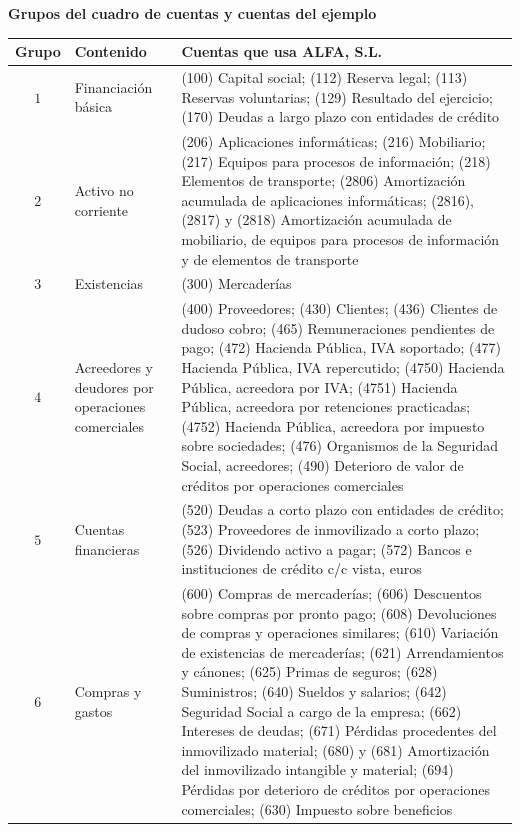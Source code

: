 \documentclass[10pt,a4paper]{article}
\begin{document}
\begin{center}\begin{minipage}{\linewidth}\centering
{\small\textbf{Grupos del cuadro de cuentas y cuentas del ejemplo}}\par\vspace{0.3em}
{\small
\begin{tabular}{c p{3.6cm} p{10.1cm}}
\hline
\textbf{Grupo} & \textbf{Contenido} & \textbf{Cuentas que usa ALFA, S.L.} \\
\hline
$1$ & \raggedright Financiación básica & (100) Capital social; (112) Reserva legal; (113) Reservas voluntarias; (129) Resultado del ejercicio; (170) Deudas a largo plazo con entidades de crédito \tabularnewline
$2$ & \raggedright Activo no corriente & (206) Aplicaciones informáticas; (216) Mobiliario; (217) Equipos para procesos de información; (218) Elementos de transporte; (2806) Amortización acumulada de aplicaciones informáticas; (2816), (2817) y (2818) Amortización acumulada de mobiliario, de equipos para procesos de información y de elementos de transporte \tabularnewline
$3$ & \raggedright Existencias & (300) Mercaderías \tabularnewline
$4$ & \raggedright Acreedores y deudores por operaciones comerciales & (400) Proveedores; (430) Clientes; (436) Clientes de dudoso cobro; (465) Remuneraciones pendientes de pago; (472) Hacienda Pública, IVA soportado; (477) Hacienda Pública, IVA repercutido; (4750) Hacienda Pública, acreedora por IVA; (4751) Hacienda Pública, acreedora por retenciones practicadas; (4752) Hacienda Pública, acreedora por impuesto sobre sociedades; (476) Organismos de la Seguridad Social, acreedores; (490) Deterioro de valor de créditos por operaciones comerciales \tabularnewline
$5$ & \raggedright Cuentas financieras & (520) Deudas a corto plazo con entidades de crédito; (523) Proveedores de inmovilizado a corto plazo; (526) Dividendo activo a pagar; (572) Bancos e instituciones de crédito c/c vista, euros \tabularnewline
$6$ & \raggedright Compras y gastos & (600) Compras de mercaderías; (606) Descuentos sobre compras por pronto pago; (608) Devoluciones de compras y operaciones similares; (610) Variación de existencias de mercaderías; (621) Arrendamientos y cánones; (625) Primas de seguros; (628) Suministros; (640) Sueldos y salarios; (642) Seguridad Social a cargo de la empresa; (662) Intereses de deudas; (671) Pérdidas procedentes del inmovilizado material; (680) y (681) Amortización del inmovilizado intangible y material; (694) Pérdidas por deterioro de créditos por operaciones comerciales; (630) Impuesto sobre beneficios \tabularnewline

\end{tabular}}
\end{minipage}
\end{center}
\end{document}
